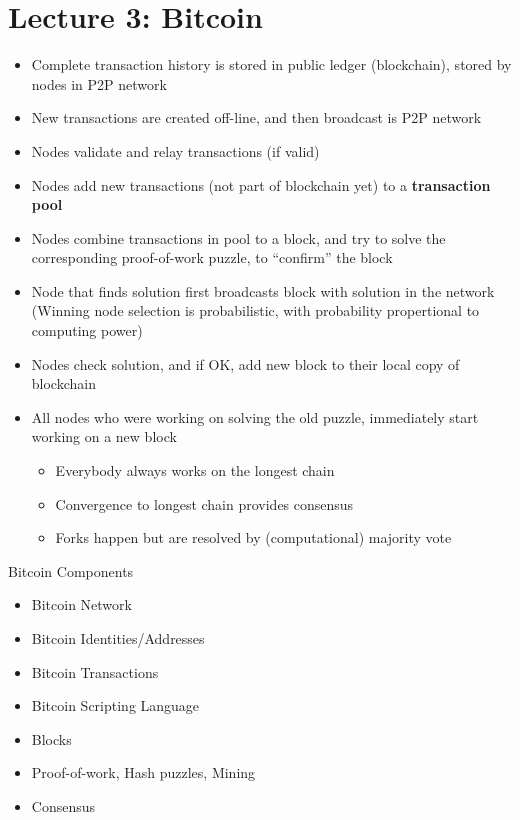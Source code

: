 \section{Lecture 3: Bitcoin}
\begin{itemize}
	\item Complete transaction history is stored in public ledger (blockchain), stored by nodes in P2P network
	\item New transactions are created off-line, and then broadcast is P2P network
	\item Nodes validate and relay transactions (if valid)
	\item Nodes add new transactions (not part of blockchain yet) to a \textbf{transaction pool}
	\item Nodes combine transactions in pool to a block, and try to solve the corresponding proof-of-work puzzle, to ``confirm'' the block
	\item Node that finds solution first broadcasts block with solution in the network (Winning node selection is probabilistic, with probability propertional to computing power)
	\item Nodes check solution, and if OK, add new block to their local copy of blockchain
	\item All nodes who were working on solving the old puzzle, immediately start working on a new block
	\begin{itemize}
		\item Everybody always works on the longest chain
		\item Convergence to longest chain provides consensus
		\item Forks happen but are resolved by (computational) majority vote
	\end{itemize}
\end{itemize}
\begin{note}{Bitcoin Components}
	\begin{itemize}
		\item Bitcoin Network
		\item Bitcoin Identities/Addresses
		\item Bitcoin Transactions
		\item Bitcoin Scripting Language
		\item Blocks
		\item Proof-of-work, Hash puzzles, Mining
		\item Consensus
	\end{itemize}
\end{note}

